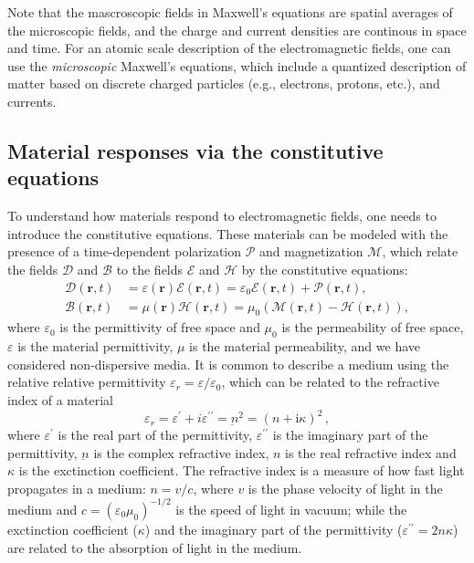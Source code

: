 Note that the mascroscopic fields in Maxwell's equations
are spatial averages of the
microscopic fields, and the charge and current densities are continous in space
and time.
For an atomic scale description of the electromagnetic fields, one can use the
\emph{microscopic}
Maxwell's equations, which include a quantized description of matter based on
discrete charged particles
(e.g., electrons, protons, etc.), and currents.\\

\subsection*{Material responses via the constitutive equations}

To understand how materials respond to electromagnetic fields,
one needs to introduce the constitutive equations. These materials can be
modeled
with the presence of a time-dependent polarization $\bm{\mathcal{P}}$ and
magnetization $\bm{\mathcal{M}}$,
which relate the fields $\bm{\mathcal{D}}$ and $\bm{\mathcal{B}}$ to the fields
$\bm{\mathcal{E}}$ and
$\bm{\mathcal{H}}$ by the constitutive equations:
\begin{align}
    \bm{\mathcal{D}}(\mathbf{r}, t) & = \varepsilon(\mathbf{r}) \bm{\mathcal{E}}(\mathbf{r}, t) =
    \varepsilon_0 \bm{\mathcal{E}}(\mathbf{r}, t) + \bm{\mathcal{P}}(\mathbf{r}, t),
    \label{eq:D}                                                                \\
    \bm{\mathcal{B}}(\mathbf{r}, t) & =  \mu(\mathbf{r}) \bm{\mathcal{H}}(\mathbf{r},
    t) = \mu_0 \left( \bm{\mathcal{M}}(\mathbf{r},
    t) - \bm{\mathcal{H}}(\mathbf{r}, t)\right) \label{eq:H},
\end{align}
where $\varepsilon_0$ is the permittivity of free space and $\mu_0$ is the
permeability of free space, $\varepsilon$ is the material permittivity, 
$\mu$ is the material permeability, and we have considered non-dispersive media. It is common to describe a medium
using the relative relative permittivity $\varepsilon_r=\varepsilon/\varepsilon_0$, which can be related to the refractive index of a material~\cite{wooten}
\begin{equation}
    \varepsilon_r = \varepsilon^\prime +
i\varepsilon^{\prime\prime} = \underbar{n}^2 = (n+\text{i}\kappa)^2\,,
\end{equation}
where $\varepsilon^\prime$ is the real part of the permittivity, $\varepsilon^{\prime\prime}$ is the imaginary part of the permittivity, $\underbar{n}$ is the complex refractive index, 
$n$ is the real refractive index and $\kappa$ is the exctinction coefficient. 
The refractive index is a measure of how fast light propagates in a medium: $n=v/c$, where $v$ is the phase velocity of light in the medium and 
$c=(\varepsilon_0 \mu_0)^{-1/2}$ is the speed of light in vacuum; while the exctinction
coefficient ($\kappa$) and the imaginary part of the permittivity ($\varepsilon^{\prime\prime}=2n\kappa$) are related to the absorption of light in the medium.

